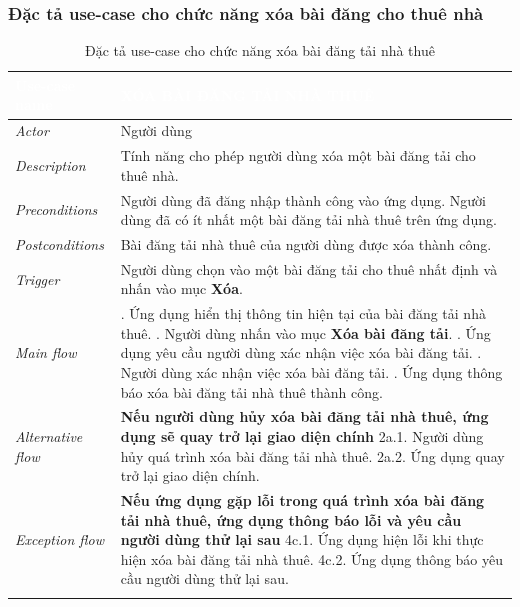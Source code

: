 \subsubsection{Đặc tả use-case cho chức năng xóa bài đăng cho thuê nhà}
\begin{center}
    \arrayrulewidth=2pt
    \begin{longtable}{
        |>{\raggedright\arraybackslash}p{3cm}
        |>{\raggedright\arraybackslash}p{13cm}
        |}
        \hline
        \rowcolor{cyan!75!black} \textcolor{white}{\textbf{Use-case name}} & \textcolor{white}{\textbf{XÓA BÀI ĐĂNG TẢI NHÀ THUÊ}}
        \\\hline
        \rowcolor{cyan!10!white} \textit{Actor} & Người dùng
        \\\hdashline
        \rowcolor{cyan!10!white} \textit{Description} & Tính năng cho phép người dùng xóa một bài đăng tải cho thuê nhà.
        \\\hdashline
        \rowcolor{cyan!10!white} \textit{Preconditions} & Người dùng đã đăng nhập thành công vào ứng dụng. Người dùng đã có ít nhất một bài đăng tải nhà thuê trên ứng dụng.
        \\\hdashline
        \rowcolor{cyan!10!white} \textit{Postconditions} & Bài đăng tải nhà thuê của người dùng được xóa thành công.
        \\\hdashline
        \rowcolor{cyan!10!white} \textit{Trigger} & Người dùng chọn vào một bài đăng tải cho thuê nhất định và nhấn vào mục \textbf{Xóa}.
        \\\hdashline
        \rowcolor{cyan!10!white} \textit{Main flow} &
        1. Ứng dụng hiển thị thông tin hiện tại của bài đăng tải nhà thuê. \newline
        3. Người dùng nhấn vào mục \textbf{Xóa bài đăng tải}. \newline
        4. Ứng dụng yêu cầu người dùng xác nhận việc xóa bài đăng tải. \newline
        5. Người dùng xác nhận việc xóa bài đăng tải. \newline
        6. Ứng dụng thông báo xóa bài đăng tải nhà thuê thành công.
        \\\hdashline
        \rowcolor{cyan!10!white} \textit{Alternative flow} & 
        \textbf{Nếu người dùng hủy xóa bài đăng tải nhà thuê, ứng dụng sẽ quay trở lại giao diện chính} \newline
        2a.1. Người dùng hủy quá trình xóa bài đăng tải nhà thuê. \newline
        2a.2. Ứng dụng quay trở lại giao diện chính.
        \\\hdashline
        \rowcolor{cyan!10!white} \textit{Exception flow} & 
        \textbf{Nếu ứng dụng gặp lỗi trong quá trình xóa bài đăng tải nhà thuê, ứng dụng thông báo lỗi và yêu cầu người dùng thử lại sau} \newline
        4c.1. Ứng dụng hiện lỗi khi thực hiện xóa bài đăng tải nhà thuê. \newline
        4c.2. Ứng dụng thông báo yêu cầu người dùng thử lại sau.
        \\\hline
        \caption{Đặc tả use-case cho chức năng xóa bài đăng tải nhà thuê}
    \end{longtable}
\end{center}